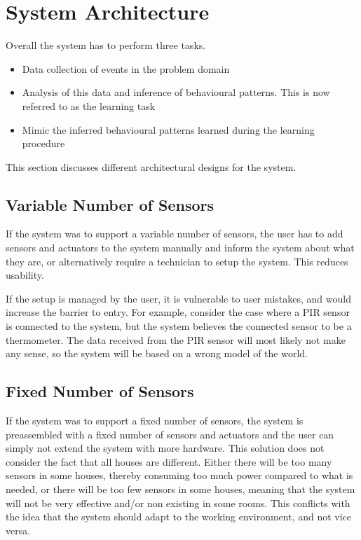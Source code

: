 \section{System Architecture}\label{sec:architecture}

Overall the system has to perform three tasks.

\begin{itemize}
\item Data collection of events in the problem domain
\item Analysis of this data and inference of behavioural patterns. This is now referred to as the learning task
\item Mimic the inferred behavioural patterns learned during the learning procedure
\end{itemize}
This section discusses different architectural designs for the system.

\subsection{Variable Number of Sensors}
If the system was to support a variable number of sensors, the user has to add sensors and actuators to the system manually and inform the system about what they are, or alternatively require a technician to setup the system. This reduces usability.

If the setup is managed by the user, it is vulnerable to user mistakes, and would increase the barrier to entry. For example, consider the case where a PIR sensor is connected to the system, but the system believes the connected sensor to be a thermometer. The data received from the PIR sensor will most likely not make any sense, so the system will be based on a wrong model of the world.

\subsection{Fixed Number of Sensors}
If the system was to support a fixed number of sensors, the system is preassembled with a fixed number of sensors and actuators and the user can simply not extend the system with more hardware. This solution does not consider the fact that all houses are different. Either there will be too many sensors in some houses, thereby consuming too much power compared to what is needed, or there will be too few sensors in some houses, meaning that the system will not be very effective and/or non existing in some rooms. This conflicts with the idea that the system should adapt to the working environment, and not vice versa.

